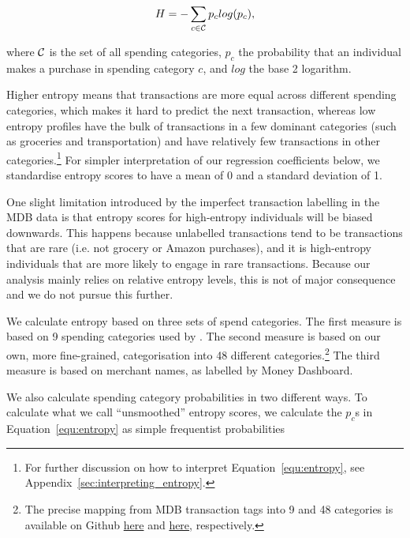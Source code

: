 \begin{equation}
\label{equ:entropy}
H = -\sum_{c \in \mathcal{C}}{p_c}log(p_c),
\end{equation}

\noindent where $\mathcal{C}$ is the set of all spending categories, $p_c$ the
probability that an individual makes a purchase in spending category $c$, and
$log$ the base 2 logarithm.

Higher entropy means that transactions are more equal across different spending
categories, which makes it hard to predict the next transaction, whereas low
entropy profiles have the bulk of transactions in a few dominant categories
(such as groceries and transportation) and have relatively few transactions in
other categories.\footnote{For further discussion on how to interpret
Equation~\ref{equ:entropy}, see Appendix~\ref{sec:interpreting_entropy}.} For
simpler interpretation of our regression coefficients below, we standardise
entropy scores to have a mean of 0 and a standard deviation of 1.

One slight limitation introduced by the imperfect transaction labelling in the
MDB data is that entropy scores for high-entropy individuals will be biased
downwards. This happens because unlabelled transactions tend to be transactions
that are rare (i.e. not grocery or Amazon purchases), and it is high-entropy
individuals that are more likely to engage in rare transactions. Because our
analysis mainly relies on relative entropy levels, this is not of major
consequence and we do not pursue this further.

We calculate entropy based on three sets of spend categories. The first measure
is based on 9 spending categories used by \citet{muggleton2020evidence}. The
second measure is based on our own, more fine-grained, categorisation into 48
different categories.\footnote{The precise mapping from MDB transaction tags
    into 9 and 48 categories is available on Github
    \href{https://github.com/fabiangunzinger/entropy/blob/7fa9c565bf8959ea92a9d4fe2245da0864e19c27/src/data/txn_classifications.py\#L249}{here}
    and
    \href{https://github.com/fabiangunzinger/entropy/blob/7fa9c565bf8959ea92a9d4fe2245da0864e19c27/src/data/txn_classifications.py\#L503}{here},
respectively.} The third measure is based on merchant names, as labelled by
Money Dashboard.

We also calculate spending category probabilities in two different ways. To
calculate what we call ``unsmoothed'' entropy scores, we calculate the $p_c$s
in Equation~\ref{equ:entropy} as simple frequentist probabilities

